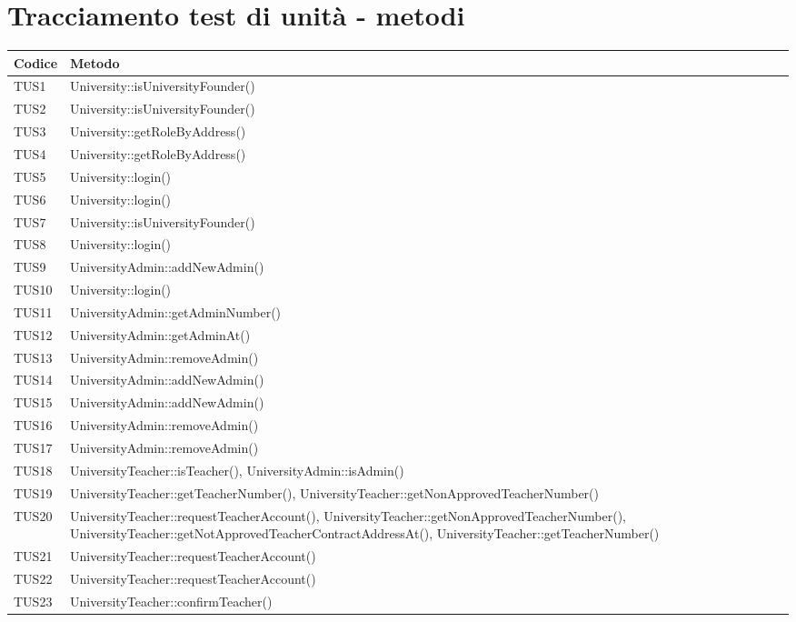 \documentclass[PianoDiQualifica.tex]{subfiles}
\begin{document}
\section{Tracciamento test di unità - metodi}
\begin{longtable}[H]{P{5cm}P{9cm}}
	\color{CHeaderText}\textbf{Codice} & 
	\color{CHeaderText}\textbf{Metodo} \\
	\endhead
	TUS1 & University::isUniversityFounder() \\ 
	TUS2 & University::isUniversityFounder() \\
	TUS3 & University::getRoleByAddress() \\
	TUS4 & University::getRoleByAddress() \\
	TUS5 & University::login() \\
	TUS6 & University::login() \\
	TUS7 & University::isUniversityFounder() \\
	TUS8 & University::login() \\
	TUS9 & UniversityAdmin::addNewAdmin() \\
	TUS10 & University::login() \\
	TUS11 & UniversityAdmin::getAdminNumber() \\
	TUS12 & UniversityAdmin::getAdminAt() \\
	TUS13 & UniversityAdmin::removeAdmin() \\
	TUS14 & UniversityAdmin::addNewAdmin() \\
	TUS15 & UniversityAdmin::addNewAdmin() \\
	TUS16 & UniversityAdmin::removeAdmin() \\
	TUS17 & UniversityAdmin::removeAdmin() \\
	TUS18 & UniversityTeacher::isTeacher(), UniversityAdmin::isAdmin() \\
	TUS19 & UniversityTeacher::getTeacherNumber(), UniversityTeacher::getNonApprovedTeacherNumber() \\
	TUS20 & UniversityTeacher::requestTeacherAccount(), UniversityTeacher::getNonApprovedTeacherNumber(), UniversityTeacher::getNotApprovedTeacherContractAddressAt(), UniversityTeacher::getTeacherNumber() \\
	TUS21 & UniversityTeacher::requestTeacherAccount() \\
	TUS22 & UniversityTeacher::requestTeacherAccount() \\
	TUS23 & UniversityTeacher::confirmTeacher() \\

\end{longtable}
\end{document}
